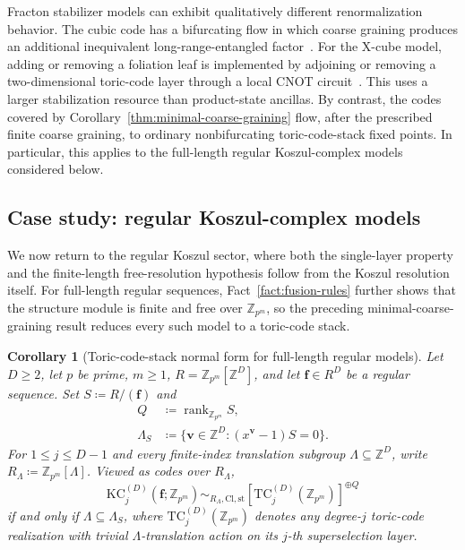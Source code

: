 \documentclass[aps,prx,english,superscriptaddress,twocolumn,tightenlines,showpacs,longbibliography,floatfix,amsfonts]{revtex4-2}
\newtheorem{corollary}{Corollary}
\theoremstyle{remark}
\theoremstyle{definition}
\begin{document}
Fracton stabilizer models can exhibit qualitatively different
renormalization behavior. The cubic code has a bifurcating flow in which
coarse graining produces an additional inequivalent long-range-entangled
factor~\cite{Haah2014Bifurcation}. For the X-cube model, adding or removing a
foliation leaf is implemented by adjoining or removing a two-dimensional
toric-code layer through a local CNOT
circuit~\cite{ShirleySlagleWangChen2018Fracton}. This uses a larger
stabilization resource than product-state ancillas. By contrast, the codes
covered by Corollary~\ref{thm:minimal-coarse-graining} flow, after the
prescribed finite coarse graining, to ordinary nonbifurcating
toric-code-stack fixed points. In particular, this applies to the full-length
regular Koszul-complex models considered below.



\subsection{Case study: regular Koszul-complex models}
\label{subsec:koszul-multistack-rigidity}

We now return to the regular Koszul sector, where both the single-layer
property and the finite-length free-resolution hypothesis follow from the
Koszul resolution itself. For full-length regular sequences,
Fact~\ref{fact:fusion-rules} further shows that the structure module is finite
and free over \(\mathbb Z_{p^m}\), so the preceding minimal-coarse-graining
result reduces every such model to a toric-code stack.

\begin{corollary}[Toric-code-stack normal form for full-length regular models]
	\label{cor:koszul-multistack-rigidity}
	Let \(D\geq2\), let \(p\) be prime, \(m\geq1\),
	\(R=\mathbb Z_{p^m}[\mathbb Z^D]\), and let \(\mathbf f\in R^D\) be a
	regular sequence. Set \(S\coloneqq R/(\mathbf f)\) and
	\begin{equation}
		\begin{aligned}
			Q&\coloneqq\operatorname{rank}_{\mathbb Z_{p^m}}S,\\
			\Lambda_S&\coloneqq
			\bigl\{\mathbf v\in\mathbb Z^D:(x^{\mathbf v}-1)S=0\bigr\}.
		\end{aligned}
	\end{equation}
	For \(1\leq j\leq D-1\) and every finite-index translation subgroup
	\(\Lambda\subseteq\mathbb Z^D\), write
	\(R_\Lambda\coloneqq\mathbb Z_{p^m}[\Lambda]\). Viewed as codes over
	\(R_\Lambda\),
	\begin{equation}
		\mathrm{KC}_j^{(D)}(\mathbf f;\mathbb Z_{p^m})
		\sim_{R_\Lambda,\mathrm{Cl},\mathrm{st}}
		\left[\mathrm{TC}_j^{(D)}(\mathbb Z_{p^m})\right]^{\oplus Q}
	\end{equation}
	if and only if \(\Lambda\subseteq\Lambda_S\), where
	\(\mathrm{TC}_j^{(D)}(\mathbb Z_{p^m})\) denotes any degree-\(j\) toric-code
	realization with trivial \(\Lambda\)-translation action on its
	\(j\)-th superselection layer.
\end{corollary}
\end{document}
